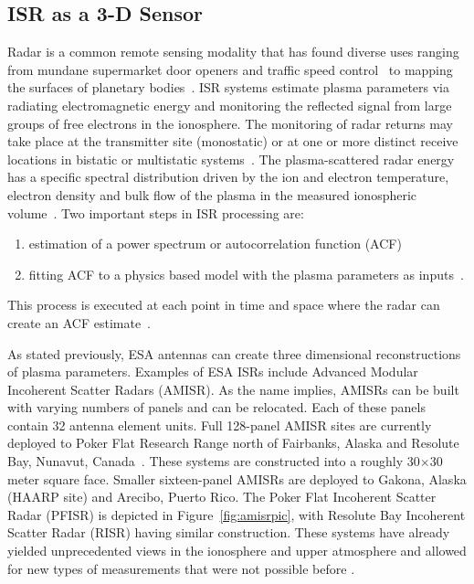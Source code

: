 \subsection{ISR as a 3-D Sensor}
Radar is a common remote sensing modality that has found diverse uses ranging from mundane supermarket door openers and traffic speed control~\cite{richards2010principles} to mapping the surfaces of planetary bodies~\cite{campbell2002radar}. ISR systems estimate plasma parameters via radiating electromagnetic energy and monitoring the reflected signal from large groups of free electrons in the ionosphere. The monitoring of radar returns may take place at the transmitter site (monostatic) or at one or more distinct receive locations in bistatic or multistatic systems~\cite{RDS:RDS2903}. The plasma-scattered radar energy has a specific spectral distribution driven by the ion and electron temperature, electron density and bulk flow of the plasma in the measured ionospheric volume~\cite{dougherty:farley1960,farleydougherty:ISR2,doughteryfarley:ISR3,hagfors1961}. Two important steps in ISR processing are:
\begin{enumerate}
\item estimation of a power spectrum or autocorrelation function (ACF)~\cite{farley1969}
\item fitting ACF to a physics based model with the plasma parameters as inputs~\cite{RDS:RDS1387}.
\end{enumerate}
This process is executed at each point in time and space where the radar can create an ACF estimate~\cite{nikoukar2008}. 

As stated previously, ESA antennas can create three dimensional reconstructions of plasma parameters. Examples of ESA ISRs include Advanced Modular Incoherent Scatter Radars (AMISR).
As the name implies, AMISRs can be built with varying numbers of panels and can be relocated. Each of these panels contain 32 antenna element units.
Full 128-panel AMISR sites are currently deployed to Poker Flat Research Range north of Fairbanks, Alaska and Resolute Bay, Nunavut, Canada~\cite{Semeter2009738,Valentic:2013jg,Nicolls2015a}. These systems are constructed into a roughly 30$\times$30 meter square face.
Smaller sixteen-panel AMISRs are deployed to Gakona, Alaska (HAARP site) and Arecibo, Puerto Rico.
The Poker Flat Incoherent Scatter Radar (PFISR) is depicted in Figure~\ref{fig:amisrpic}, with Resolute Bay Incoherent Scatter Radar (RISR) having similar construction. 
These systems have already yielded unprecedented views in the ionosphere and upper atmosphere and allowed for new types of measurements that were not possible before \cite{semeter2010CI,butler:imagingfregiondrifts,Nicolls:2007ie}. %

